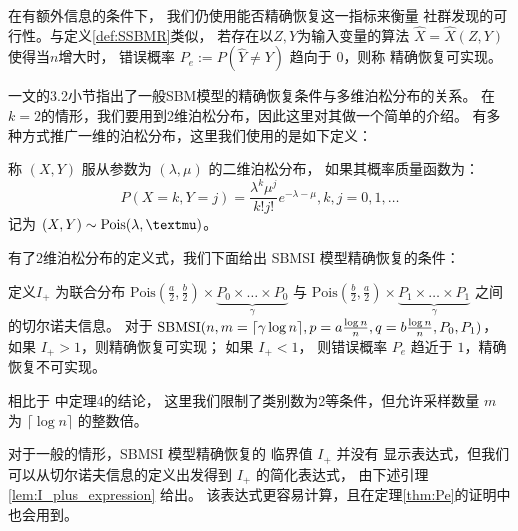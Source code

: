  在有额外信息的条件下，
 我们仍使用能否精确恢复这一指标来衡量
 社群发现的可行性。与定义\ref{def:SSBMR}类似，
 若存在以$Z,Y$为输入变量的算法 $\hat{X}=\hat{X}(Z,Y)$
 使得当$n$增大时，
 错误概率
 $P_e:=P(\hat{Y} \neq Y)$ 趋向于 $0$，则称
 精确恢复可实现。

 \citet{abbe2015community}一文的3.2小节指出了一般SBM模型的精确恢复条件与多维泊松分布的关系。
在$k=2$的情形，我们要用到2维泊松分布，因此这里对其做一个简单的介绍。
有多种方式推广一维的泊松分布，这里我们使用的是如下定义：

\begin{definition}
    称 $(X,Y)$ 服从参数为 $(\lambda, \mu)$ 的二维泊松分布，
    如果其概率质量函数为：
    \begin{equation}
        P(X=k, Y=j) = \frac{\lambda^k \mu^j}{k! j!}
        e^{-\lambda - \mu}, k,j=0,1,\dots
    \end{equation}
    记为 $(X,Y) \sim \Pois(\lambda, \mu)$。
\end{definition}

有了2维泊松分布的定义式，我们下面给出
SBMSI 模型精确恢复的条件：
\begin{theorem}\label{thm:Pe}
    定义$I_+$ 为联合分布 $\textrm{Pois}(\frac{a}{2},\frac{b}{2})\times \underbrace{P_0 \times \dots \times P_0}_{\gamma}$
    与 $\textrm{Pois}(\frac{b}{2}, \frac{a}{2})\times \underbrace{P_1 \times \dots \times P_1}_{\gamma}$ 
    之间的切尔诺夫信息。    
    对于 $\operatorname{SBMSI}(n,m=\lceil \gamma \log n \rceil, p=a\frac{\log n}{n},q=b\frac{\log n}{n},P_0,P_1)$，
    如果 $I_+>1$，则精确恢复可实现；
    如果 $I_+ < 1$，
    则错误概率 $P_e$ 趋近于 $1$，精确恢复不可实现。
\end{theorem}

相比于 \citet{abbe17sideinfo} 中定理4的结论，
这里我们限制了类别数为2等条件，但允许采样数量 $m$ 为
$\lceil \log n \rceil $ 的整数倍。

对于一般的情形，SBMSI 模型精确恢复的 临界值 $I_+$ 并没有
显示表达式，但我们可以从切尔诺夫信息的定义出发得到 $I_+$ 的简化表达式，
由下述引理 \ref{lem:I_plus_expression} 给出。
该表达式更容易计算，且在定理\ref{thm:Pe}的证明中也会用到。


